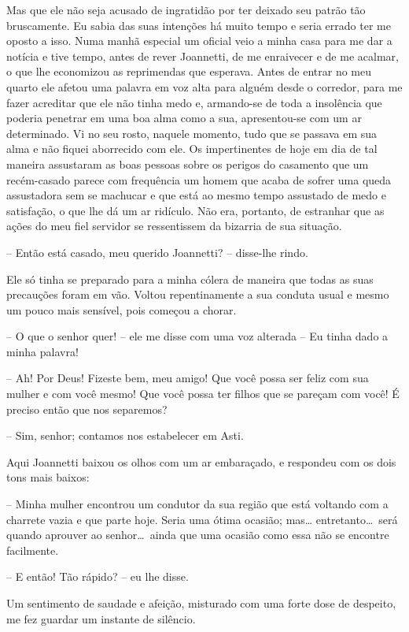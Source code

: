  Mas que ele não seja acusado de ingratidão por ter deixado seu patrão
tão bruscamente. Eu sabia das suas intenções há muito tempo e seria
errado ter me oposto a isso. Numa manhã especial um oficial veio a
minha casa para me dar a notícia e tive tempo, antes de rever
Joannetti, de me enraivecer e de me acalmar, o que lhe economizou as
reprimendas que esperava. Antes de entrar no meu quarto ele afetou uma
palavra em voz alta para alguém desde o corredor, para me fazer
acreditar que ele não tinha medo e, armando-se de toda a insolência que
poderia penetrar em uma boa alma como a sua, apresentou-se com um ar
determinado. Vi no seu rosto, naquele momento, tudo que se passava em
sua alma e não fiquei aborrecido com ele. Os impertinentes de hoje em
dia de tal maneira assustaram as boas pessoas sobre os perigos do
casamento que um recém-casado parece com frequência um homem que acaba
de sofrer uma queda assustadora sem se machucar e que está ao mesmo
tempo assustado de medo e satisfação, o que lhe dá um ar ridículo. Não
era, portanto, de estranhar que as ações do meu fiel servidor se
ressentissem da bizarria de sua situação. 

 -- Então está casado, meu querido Joannetti? -- disse-lhe rindo.

 Ele só tinha se preparado para a minha cólera de maneira que todas as
suas precauções foram em vão. Voltou repentinamente a sua conduta usual
e mesmo um pouco mais sensível, pois começou a chorar. 

 -- O que o senhor quer! -- ele me disse com uma voz alterada -- Eu
tinha dado a minha palavra!

 -- Ah! Por Deus! Fizeste bem, meu amigo! Que você possa ser feliz com sua
mulher e com você mesmo! Que você possa ter filhos que se pareçam com você! É
preciso então que nos separemos? 

 -- Sim, senhor; contamos nos estabelecer em Asti.

 Aqui Joannetti baixou os olhos com um ar embaraçado, e respondeu com os
dois tons mais baixos:

 -- Minha mulher encontrou um condutor da sua região que está voltando
com a charrete vazia e que parte hoje. Seria uma ótima ocasião; mas\ldots
entretanto\ldots\ será quando aprouver ao senhor\ldots\ ainda que uma ocasião
como essa não se encontre facilmente.

 -- E então! Tão rápido? -- eu lhe disse. 

Um sentimento de saudade e afeição, misturado com uma forte dose de
despeito, me fez guardar um instante de silêncio. 

